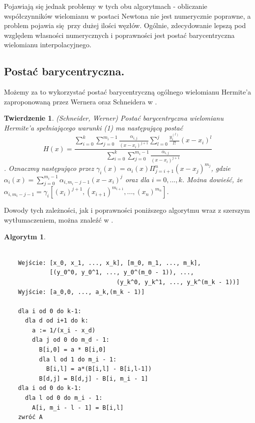\documentclass[10pt,wide]{mwart}
\newtheorem{tw}{Twierdzenie}
\theoremstyle{definition}
\newtheorem{alg}{Algorytm}
\begin{document}
Pojawiają się jednak problemy w tych obu algorytmach - obliczanie współczynników wielomianu w postaci Newtona nie jest numerycznie poprawne, a problem pojawia się przy dużej ilości węzłów.
Ogólnie, zdecydowanie lepszą pod względem własności numerycznych i poprawności jest postać barycentryczna wielomianu interpolacyjnego.
\subsection{Postać barycentryczna.}
Możemy za to wykorzystać postać barycentryczną ogólnego wielomianu Hermite'a zaproponowaną przez Wernera oraz Schneidera w \cite{CSWW}.
\begin{tw} (Schneider, Werner)
Postać barycentryczna wielomianu Hermite'a spełniającego warunki (1) ma następującą postać
\begin{equation}
  H(x) = \frac{\sum_{i=0}^{k}\sum_{j=0}^{m_i - 1}\frac{\alpha_{i,j}}{(x - x_i)^{j+1}}\sum_{l=0}^{j}\frac{y_i^{(l)}}{l!}(x-x_i)^l}{\sum_{i=0}^{k}\sum_{j=0}^{m_i - 1}\frac{\alpha_{i,j}}{(x - x_i)^{j+1}}}
\end{equation}.
Oznaczmy następująco przez \(\gamma_i(x) = \alpha_i(x)\Pi_{j=i+1}^{n}(x-x_j)^{m_j}\), gdzie \(\alpha_i(x) = \sum_{j=0}^{m_i - 1}\alpha_{i,m_i-j-1}(x-x_i)^j\)
oraz dla \(i=0,...,k\). Można dowieść, że \(\alpha_{i,m_i-j-1} = \gamma_i[(x_i)^{j+1}, (x_{i+1})^{m_{i+1}}, ..., (x_n)^{m_n}]\).
\end{tw}
Dowody tych zależności, jak i poprawności poniższego algorytmu wraz z szerszym wytłumaczeniem, można znaleźć w \cite{CSWW}.
\begin{alg}
  \begin{verbatim}

    Wejście: [x_0, x_1, ..., x_k], [m_0, m_1, ..., m_k],
             [(y_0^0, y_0^1, ..., y_0^(m_0 - 1)), ...,
                                (y_k^0, y_k^1, ..., y_k^(m_k - 1))]
    Wyjście: [a_0,0, ..., a_k,(m_k - 1)]

    dla i od 0 do k-1:
      dla d od i+1 do k:
        a := 1/(x_i - x_d)
        dla j od 0 do m_d - 1:
          B[i,0] = a * B[i,0]
          dla l od 1 do m_i - 1:
            B[i,l] = a*(B[i,l] - B[i,l-1])
          B[d,j] = B[d,j] - B[i, m_i - 1]
    dla i od 0 do k-1:
      dla l od 0 do m_i - 1:
        A[i, m_i - l - 1] = B[i,l]
    zwróć A
  \end{verbatim}
\end{alg}
\end{document}
